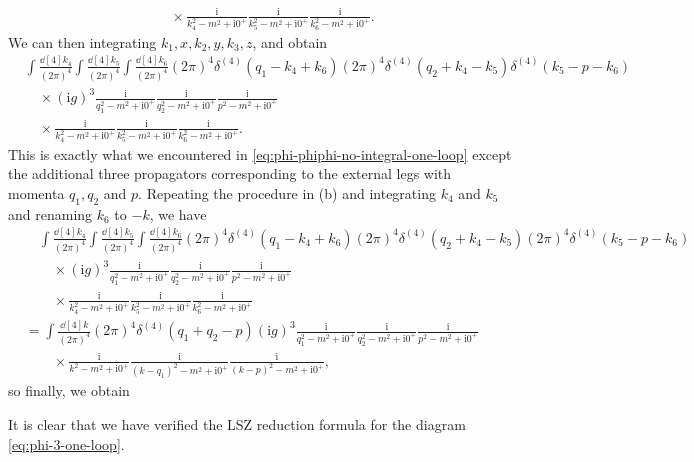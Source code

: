 \documentclass[hyperref, a4paper]{article}
\newcommand*{\ii}{\mathrm{i}}
\begin{document}
\begin{itemize}
\[\begin{aligned}
            &\quad \times \frac{\ii}{k_4^2 - m^2 + \ii 0^+} \frac{\ii}{k_5^2 - m^2 + \ii 0^+}  \frac{\ii}{k_6^2 - m^2 + \ii 0^+} .
        \end{aligned}
    \]
    We can then integrating $k_1, x, k_2, y, k_3, z$, and obtain 
    \[
        \begin{aligned}
            & \int \frac{\dd[4]{k_4}}{(2\pi)^4} \int \frac{\dd[4]{k_5}}{(2\pi)^4} \int \frac{\dd[4]{k_6}}{(2\pi)^4} 
            (2\pi)^4 \delta^{(4)}(q_1 - k_4 + k_6) (2\pi)^4 \delta^{(4)}(q_2 + k_4 - k_5) \delta^{(4)}(k_5 - p - k_6) \\
            &\quad \times (\ii g)^3 \frac{\ii}{q_1^2 - m^2 + \ii 0^+} \frac{\ii}{q_2^2 - m^2 + \ii 0^+} \frac{\ii}{p^2 - m^2 + \ii 0^+} \\
            &\quad \times \frac{\ii}{k_4^2 - m^2 + \ii 0^+} \frac{\ii}{k_5^2 - m^2 + \ii 0^+}  \frac{\ii}{k_6^2 - m^2 + \ii 0^+}.
        \end{aligned}
    \]
    This is exactly what we encountered in \eqref{eq:phi-phiphi-no-integral-one-loop} except the additional three propagators 
    corresponding to the external legs with momenta $q_1, q_2$ and $p$.
    Repeating the procedure in (b) and integrating $k_4$ and $k_5$ and renaming $k_6$ to $-k$, we have 
    \[
        \begin{aligned}
            &\quad \int \frac{\dd[4]{k_4}}{(2\pi)^4} \int \frac{\dd[4]{k_5}}{(2\pi)^4} \int \frac{\dd[4]{k_6}}{(2\pi)^4} 
            (2\pi)^4 \delta^{(4)}(q_1 - k_4 + k_6) (2\pi)^4 \delta^{(4)}(q_2 + k_4 - k_5) (2\pi)^4 \delta^{(4)}(k_5 - p - k_6) \\
            &\quad \quad \times (\ii g)^3 \frac{\ii}{q_1^2 - m^2 + \ii 0^+} \frac{\ii}{q_2^2 - m^2 + \ii 0^+} \frac{\ii}{p^2 - m^2 + \ii 0^+} \\
            &\quad \quad  \times \frac{\ii}{k_4^2 - m^2 + \ii 0^+} \frac{\ii}{k_5^2 - m^2 + \ii 0^+}  \frac{\ii}{k_6^2 - m^2 + \ii 0^+} \\
            &= \int \frac{\dd[4]{k}}{(2\pi)^4}  (2\pi)^4 \delta^{(4)}(q_1 + q_2 - p) (\ii g)^3 \frac{\ii}{q_1^2 - m^2 + \ii 0^+} \frac{\ii}{q_2^2 - m^2 + \ii 0^+} \frac{\ii}{p^2 - m^2 + \ii 0^+} \\
            &\quad \quad  \times \frac{\ii}{k^2 - m^2 + \ii 0^+} \frac{\ii}{(k - q_1)^2 - m^2 + \ii 0^+}  \frac{\ii}{(k - p)^2 - m^2 + \ii 0^+} ,
        \end{aligned}
    \]
    so finally, we obtain
    
    It is clear that we have verified the LSZ reduction formula for the diagram \eqref{eq:phi-3-one-loop}.
\end{itemize}
\end{document}
